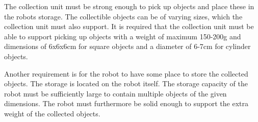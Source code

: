 The collection unit must be strong enough to pick up objects and place these in the robots storage. The collectible objects can be of varying sizes, which the collection unit must also support. It is required that the collection unit must be able to support picking up objects with a weight of maximum 150-200g and dimensions of 6x6x6cm for square objects and a diameter of 6-7cm for cylinder objects.

Another requirement is for the robot to have some place to store the collected objects. The storage is located on the robot itself. The storage capacity of the robot must be sufficiently large to contain multiple objects of the given dimensions. The robot must furthermore be solid enough to support the extra weight of the collected objects. 

